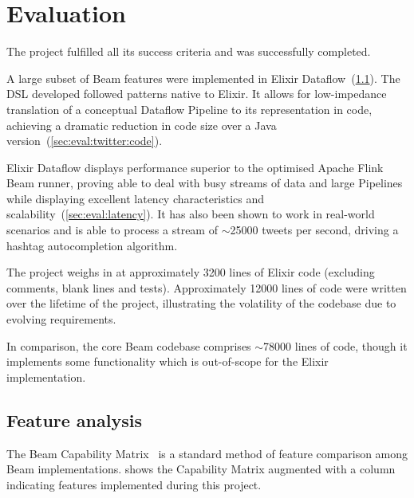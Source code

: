 \chapter{Evaluation}\label{ch:eval}
\label{sec:eval:overall}

The project fulfilled all its success criteria and was successfully completed.

A large subset of Beam features were implemented in Elixir Dataflow~(\cref{sec:eval:limitations}).
The DSL developed followed patterns native to Elixir.
It allows for low-impedance translation of a conceptual Dataflow Pipeline to its representation in code, achieving a dramatic reduction in code size over a Java version~(\cref{sec:eval:twitter:code}).

Elixir Dataflow displays performance superior to the optimised Apache Flink Beam runner, proving able to deal with busy streams of data and large Pipelines while displaying excellent latency characteristics and scalability~(\cref{sec:eval:latency}).
It has also been shown to work in real-world scenarios and is able to process a stream of $\sim$\num{25000} tweets per second, driving a hashtag autocompletion algorithm.

The project weighs in at approximately \num{3200} lines of Elixir code (excluding comments, blank lines and tests).
Approximately \num{12000} lines of code were written over the lifetime of the project, illustrating the volatility of the codebase due to evolving requirements.

In comparison, the core Beam codebase comprises $\sim$\num{78000} lines of code, though it implements some functionality which is out-of-scope for the Elixir implementation.

\section{Feature analysis}\label{sec:eval:limitations}

The Beam Capability Matrix~\cite{Beam-Cap-Matrix} is a standard method of feature comparison among Beam implementations.
 shows the Capability Matrix augmented with a column indicating features implemented during this project.

